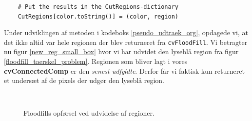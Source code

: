{\begin{lstlisting}
    # Put the results in the CutRegions-dictionary
    CutRegions[color.toString()] = (color, region)
\end{lstlisting}
Under udviklingen af metoden i kodeboks \ref{pseudo_udtraek_org},
opdagede vi, at det ikke altid var hele regionen der blev returneret fra
\texttt{cvFloodFill}. Vi betragter nu figur \ref{new_reg_small_box} hvor
vi har udvidet den lyseblå region fra figur
\ref{floodfill_taerskel_problem}.  Regionen som bliver lagt i vores
\textbf{cvConnectedComp} er den \emph{senest udfyldte}. Derfor får vi
faktisk kun returneret et undersæt af de pixels der udgør den lyseblå
region.

\begin{figure}[!h]
    \setlength\fboxsep{0pt}
    \setlength\fboxrule{0.5pt}
    \centering
    \\
    \caption[]{
    Floodfills opførsel ved udvidelse af regioner.
    }
    \label{floodfill_return_entire_region}
\end{figure}

}
